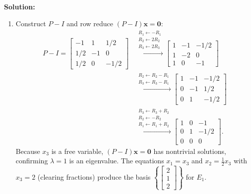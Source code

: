 \documentclass[11pt, letterpaper]{article}
\theoremstyle{definition}
\theoremstyle{remark}
\begin{document}
\textbf{Solution:}
\begin{enumerate}[label=(\alph*)]
    \item Construct $P - I$ and row reduce $(P - I)\mathbf{x} = \mathbf{0}$:
    \begin{align*}
    P - I = \begin{bmatrix} -1 & 1 & 1/2 \\ 1/2 & -1 & 0 \\ 1/2 & 0 & -1/2 \end{bmatrix}
    &\xrightarrow{\substack{R_1 \leftarrow -R_1 \\ R_2 \leftarrow 2R_2 \\ R_3 \leftarrow 2R_3}}
    \begin{bmatrix} 1 & -1 & -1/2 \\ 1 & -2 & 0 \\ 1 & 0 & -1 \end{bmatrix} \\
    &\xrightarrow{\substack{R_2 \leftarrow R_2 - R_1 \\ R_3 \leftarrow R_3 - R_1}}
    \begin{bmatrix} 1 & -1 & -1/2 \\ 0 & -1 & 1/2 \\ 0 & 1 & -1/2 \end{bmatrix} \\
    &\xrightarrow{\substack{R_3 \leftarrow R_3 + R_2 \\ R_2 \leftarrow -R_2 \\ R_1 \leftarrow R_1 + R_2}}
    \begin{bmatrix} 1 & 0 & -1 \\ 0 & 1 & -1/2 \\ 0 & 0 & 0 \end{bmatrix}.
    \end{align*}
    Because $x_3$ is a free variable, $(P - I)\mathbf{x} = \mathbf{0}$ has nontrivial solutions, confirming $\lambda = 1$ is an eigenvalue. The equations $x_1 = x_3$ and $x_2 = \frac{1}{2}x_3$ with $x_3 = 2$ (clearing fractions) produce the basis $\left\{ \begin{bmatrix} 2 \\ 1 \\ 2 \end{bmatrix} \right\}$ for $E_1$.


\end{enumerate}
\end{document}
